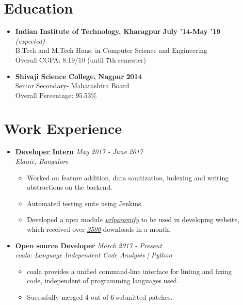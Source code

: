 \documentclass[10pt,a4paper]{moderncv}
\newcommand{\experience}[4]{
  \vspace{0.1cm}
  \item \textbf{\large{#1}} \hfill\textit{#3}\\\textit{#2}
  \begin{itemize}[leftmargin=*]
    \setlength\itemsep{0em} #4
  \end{itemize}
}
\newcommand{\education}[3]{
  \item \textbf{\large{#1}} \hfill #2\\ #3
}
\begin{document}
\maketitle
\vspace{-1cm}
\section*{Education}
\begin{itemize}
  \setlength\itemsep{1em}

  \education{Indian Institute of Technology, Kharagpur}{\textbf{July '14-May '19} \textit{(expected)}}{B.Tech and M.Tech Hons. in Computer Science and Engineering\\Overall CGPA: 8.19/10 (until 7th semester)}
  \education{Shivaji Science College, Nagpur}{\textbf{2014}}{Senior Secondary- Maharashtra Board\\Overall Percentage: 95.53\%}
\end{itemize}

\section*{Work Experience}
\begin{itemize}
  \setlength\itemsep{0.5em}

  \experience{\href{https://drive.google.com/open?id=0B5iU6cWw36rOVWZIcllPY3RSd2c}{Developer Intern}}{Elanic, Bangalore}{May 2017 - June 2017}{
  	\item	Worked on feature addition, data sanitization, indexing and writing abstractions on the backend.
  	\item Automated testing suite using Jenkins.
  	\item Developed a npm module \href{https://www.npmjs.com/package/urlparamify}{\textit{urlparamify}} to be used in developing website, which received over \href{https://drive.google.com/open?id=0B5iU6cWw36rOd09Bc3ZNV1p4UTQ}{\textit{2500}} downloads in a month.
  }
    
  \experience{\href{https://github.com/orgs/coala/teams/coala-developers/members?&query=kaustubh}{Open source Developer}}{coala: Language Independent Code Analysis | Python}{March 2017 - Present}{
  	\item coala provides a unified command-line interface for linting and fixing code, independent of programming languages used.
  	\item Sucessfully merged 4 out of 6 submitted patches. 
  }

\end{itemize}
\end{document}
